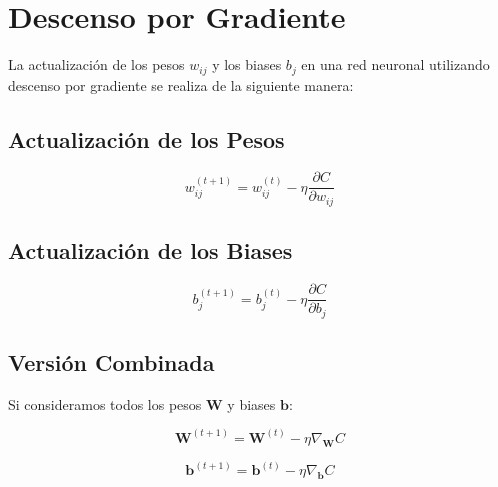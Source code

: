 \documentclass{article}
\begin{document}
	\section{Descenso por Gradiente}
	
	La actualización de los pesos \( w_{ij} \) y los biases \( b_j \) en una red neuronal utilizando descenso por gradiente se realiza de la siguiente manera:
	
	\subsection*{Actualización de los Pesos}
	
	\begin{equation}
		w_{ij}^{(t+1)} = w_{ij}^{(t)} - \eta \frac{\partial C}{\partial w_{ij}}
	\end{equation}
	
	\subsection*{Actualización de los Biases}
	
	\begin{equation}
		b_j^{(t+1)} = b_j^{(t)} - \eta \frac{\partial C}{\partial b_j}
	\end{equation}
	
	\subsection*{Versión Combinada}
	
	Si consideramos todos los pesos \( \mathbf{W} \) y biases \( \mathbf{b} \):
	
	\begin{equation}
		\mathbf{W}^{(t+1)} = \mathbf{W}^{(t)} - \eta \nabla_{\mathbf{W}} C
	\end{equation}
	
	\begin{equation}
		\mathbf{b}^{(t+1)} = \mathbf{b}^{(t)} - \eta \nabla_{\mathbf{b}} C
	\end{equation}
	





	
	
\end{document}
